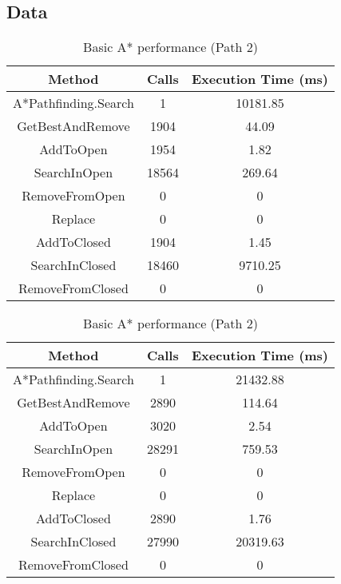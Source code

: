 \documentclass{article}
\begin{document}
  \subsection{Data}
  \begin{table}[h!]
      \parbox{.45\linewidth}{
        \centering
        \caption{Basic A* performance (Path 1)}
        \label{tab:tableA*1}
        \begin{tabular}{c|c|c}
          \textbf{Method} & \textbf{Calls} & \textbf{Execution Time (ms)}\\
          \hline
          A*Pathfinding.Search  & 1 & 10181.85\\
          GetBestAndRemove & 1904 & 44.09\\
          AddToOpen & 1954 & 1.82\\
          SearchInOpen & 18564 & 269.64\\
          RemoveFromOpen & 0 & 0\\
          Replace & 0 & 0\\
          AddToClosed & 1904  & 1.45\\
          SearchInClosed & 18460 & 9710.25\\
          RemoveFromClosed & 0 & 0\\
        \end{tabular}
      }
      \hfil
      \parbox{.45\linewidth}{
        \centering
        \caption{Basic A* performance (Path 2)}
        \label{tab:tableA*2}
        \begin{tabular}{c|c|c}
          \textbf{Method} & \textbf{Calls} & \textbf{Execution Time (ms)}\\
          \hline
          A*Pathfinding.Search  & 1 & 21432.88\\
          GetBestAndRemove & 2890 & 114.64\\
          AddToOpen & 3020 & 2.54\\
          SearchInOpen & 28291 & 759.53\\
          RemoveFromOpen & 0 & 0\\
          Replace & 0 & 0\\
          AddToClosed & 2890  & 1.76\\
          SearchInClosed & 27990 & 20319.63\\
          RemoveFromClosed & 0 & 0\\
        \end{tabular}
      }
  \end{table}
\end{document}
